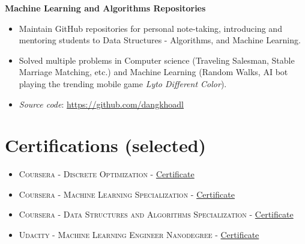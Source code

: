 \documentclass[10pt]{article}
\begin{document}
        \begin{multicols}{1}
            \begin{flushleft}
                \textbf{Machine Learning and Algorithms Repositories}
            \end{flushleft}
        \end{multicols}
        \vspace{-5mm}
        \begin{itemize}[noitemsep]
            \item Maintain GitHub repositories for personal note-taking, introducing and mentoring students to Data Structures - Algorithms, and Machine Learning.
            \item Solved multiple problems in Computer science (Traveling Salesman, Stable Marriage Matching, etc.) and Machine Learning (Random Walks, AI bot playing the trending mobile game \emph{Lyto Different Color}).
            \item \emph{Source code}: \href{https://github.com/dangkhoadl?tab=repositories}{https://github.com/dangkhoadl}
        \end{itemize}
        \vspace{-2mm}

    \vspace{2mm}
    \section{Certifications (selected)}
    \begin{itemize}[noitemsep,leftmargin=*]
        \item \textsc{Coursera - Discrete Optimization - } \href{https://www.coursera.org/account/accomplishments/verify/YXTNUBC3G3LX}{Certificate}
        \item \textsc{Coursera - Machine Learning Specialization - } \href{https://www.coursera.org/account/accomplishments/specialization/3P6TZYWVJKHY}{Certificate}
        \item \textsc{Coursera - Data Structures and Algorithms Specialization - } \href{https://www.coursera.org/account/accomplishments/specialization/AKFYZQ9QD8XH}{Certificate}
        \item \textsc{Udacity - Machine Learning Engineer Nanodegree - } \href{https://graduation.udacity.com/confirm/HK9JLR3N}{Certificate}
    \end{itemize}
\end{document}

